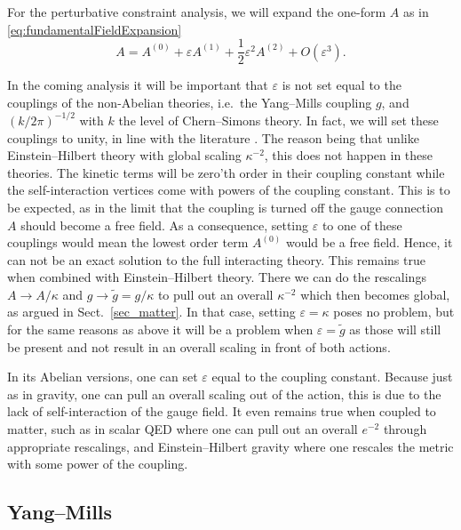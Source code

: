 \documentclass[]{jkpaper}
\theoremstyle{plain}
\theoremstyle{definition}
\newcommand{\eps}{\varepsilon}
\begin{document}
For the perturbative constraint analysis, we will expand the one-form $A$ as in \eqref{eq:fundamentalFieldExpansion}
\begin{equation}
    A = A^{(0)} + \eps A^{(1)} + \frac{1}{2} \eps^2 A^{(2)}  + O(\eps^3).
\end{equation}

In the coming analysis it will be important that $\eps$ is not set equal to the couplings of the non-Abelian theories, i.e.~the Yang--Mills coupling $g$, and $(k/2\pi)^{-1/2}$ with $k$ the level of Chern--Simons theory. In fact, we will set these couplings to unity, in line with the literature \cite{Moncrief:1977hy,Arms1,Arms:1979au,Altas:2021htf,Khavkine:2013iei}. The reason being that unlike Einstein--Hilbert theory with global scaling $\kappa^{-2}$, this does not happen in these theories. The kinetic terms will be zero'th order in their coupling constant while the self-interaction vertices come with powers of the coupling constant. This is to be expected, as in the limit that the coupling is turned off the gauge connection $A$ should become a free field. As a consequence, setting $\eps$ to one of these couplings would mean the lowest order term $A^{(0)}$ would be a free field. Hence, it can not be an exact solution to the full interacting theory. This remains true when combined with Einstein--Hilbert theory. There we can do the rescalings $A \to A / \kappa$ and $g \to \tilde{g} = g / \kappa$ to pull out an overall $\kappa^{-2}$ which then becomes global, as argued in Sect.~\ref{sec_matter}. In that case, setting $\eps = \kappa$ poses no problem, but for the same reasons as above it will be a problem when $\eps = \tilde{g}$ as those will still be present and not result in an overall scaling in front of both actions.

In its Abelian versions, one can set $\eps$ equal to the coupling constant. Because just as in gravity, one can pull an overall scaling out of the action, this is due to the lack of self-interaction of the gauge field. It even remains true when coupled to matter, such as in scalar QED where one can pull out an overall $e^{-2}$ through appropriate rescalings, and Einstein--Hilbert gravity where one rescales the metric with some power of the coupling.


\subsection{Yang--Mills}
\end{document}
